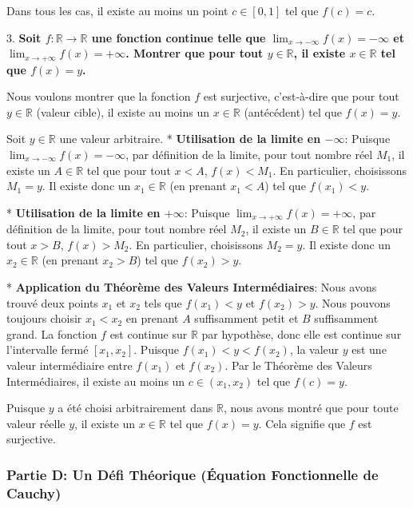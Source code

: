 \documentclass[12pt,a4paper]{report}
\begin{document}
    Dans tous les cas, il existe au moins un point $c \in [0, 1]$ tel que $f(c) = c$.

3.  \textbf{Soit $f: \mathbb{R} \to \mathbb{R}$ une fonction continue telle que $\lim_{x \to -\infty} f(x) = -\infty$ et $\lim_{x \to +\infty} f(x) = +\infty$. Montrer que pour tout $y \in \mathbb{R}$, il existe $x \in \mathbb{R}$ tel que $f(x) = y$.}

    Nous voulons montrer que la fonction $f$ est surjective, c'est-à-dire que pour tout $y \in \mathbb{R}$ (valeur cible), il existe au moins un $x \in \mathbb{R}$ (antécédent) tel que $f(x) = y$.

    Soit $y \in \mathbb{R}$ une valeur arbitraire.
    *   \textbf{Utilisation de la limite en $-\infty$}:
        Puisque $\lim_{x \to -\infty} f(x) = -\infty$, par définition de la limite, pour tout nombre réel $M_1$, il existe un $A \in \mathbb{R}$ tel que pour tout $x < A$, $f(x) < M_1$.
        En particulier, choisissons $M_1 = y$. Il existe donc un $x_1 \in \mathbb{R}$ (en prenant $x_1 < A$) tel que $f(x_1) < y$.

    *   \textbf{Utilisation de la limite en $+\infty$}:
        Puisque $\lim_{x \to +\infty} f(x) = +\infty$, par définition de la limite, pour tout nombre réel $M_2$, il existe un $B \in \mathbb{R}$ tel que pour tout $x > B$, $f(x) > M_2$.
        En particulier, choisissons $M_2 = y$. Il existe donc un $x_2 \in \mathbb{R}$ (en prenant $x_2 > B$) tel que $f(x_2) > y$.

    *   \textbf{Application du Théorème des Valeurs Intermédiaires}:
        Nous avons trouvé deux points $x_1$ et $x_2$ tels que $f(x_1) < y$ et $f(x_2) > y$. Nous pouvons toujours choisir $x_1 < x_2$ en prenant $A$ suffisamment petit et $B$ suffisamment grand.
        La fonction $f$ est continue sur $\mathbb{R}$ par hypothèse, donc elle est continue sur l'intervalle fermé $[x_1, x_2]$.
        Puisque $f(x_1) < y < f(x_2)$, la valeur $y$ est une valeur intermédiaire entre $f(x_1)$ et $f(x_2)$.
        Par le Théorème des Valeurs Intermédiaires, il existe au moins un $c \in (x_1, x_2)$ tel que $f(c) = y$.

    Puisque $y$ a été choisi arbitrairement dans $\mathbb{R}$, nous avons montré que pour toute valeur réelle $y$, il existe un $x \in \mathbb{R}$ tel que $f(x) = y$. Cela signifie que $f$ est surjective.

\subsubsection{Partie D: Un Défi Théorique (Équation Fonctionnelle de Cauchy)}
\end{document}
